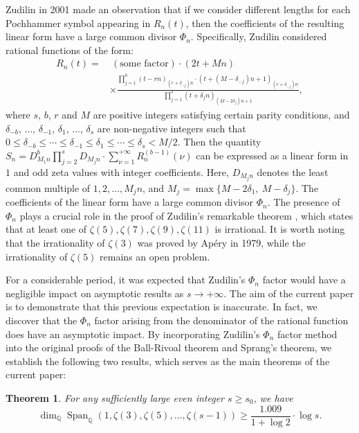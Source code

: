 \documentclass[12pt]{article}
\newtheorem{theorem}{Theorem}[section]
\numberwithin{equation}{section}
\begin{document}
Zudilin in 2001 made an observation \cite{Zud2001} that if we consider different lengths for each Pochhammer symbol appearing in $R_n(t)$, then the coefficients of the resulting linear form have a large common divisor $\Phi_n$. Specifically, Zudilin considered rational functions of the form:
\begin{align*}
R_n(t) =&~ (\text{some factor})\cdot(2t+Mn) \\
&\times \frac{\prod_{j=1}^{b}(t-rn)_{(r+\delta_{-j})n} \cdot (t+(M-\delta_{-j})n+1)_{(r+\delta_{-j})n}}{\prod_{j=1}^{s} (t+\delta_jn)_{(M-2\delta_j)n+1}}, 
\end{align*}
where $s$, $b$, $r$ and $M$ are positive integers satisfying certain parity conditions, and $\delta_{-b}$, $\ldots$, $\delta_{-1}$, $\delta_{1}$, $\ldots$, $\delta_{s}$ are non-negative integers such that $0 \leqslant \delta_{-b} \leqslant \cdots \leqslant \delta_{-1} \leqslant \delta_{1} \leqslant \cdots \leqslant \delta_{s} < M/2$. Then the quantity $S_n = D_{M_1n}^{b}\prod_{j=2}^{s} D_{M_jn} \cdot \sum_{\nu=1}^{+\infty} R_n^{(b-1)}(\nu)$ can be expressed as a linear form in $1$ and odd zeta values with integer coefficients. Here, $D_{M_jn}$ denotes the least common multiple of $1,2,\ldots,M_jn$, and $M_j= \max\{ M-2\delta_1,~M-\delta_j\}$. The coefficients of the linear form have a large common divisor $\Phi_n$. The presence of $\Phi_n$ plays a crucial role in the proof of Zudilin's remarkable theorem \cite{Zud2001}, which states that at least one of $\zeta(5), \zeta(7), \zeta(9), \zeta(11)$ is irrational. It is worth noting that the irrationality of $\zeta(3)$ was proved by Ap\'ery \cite{Ap1979} in 1979, while the irrationality of $\zeta(5)$ remains an open problem.

For a considerable period, it was expected that Zudilin's $\Phi_n$ factor would have a negligible impact on asymptotic results as $s \to +\infty$. The aim of the current paper is to demonstrate that this previous expectation is inaccurate. In fact, we discover that the $\Phi_n$ factor arising from the denominator of the rational function does have an asymptotic impact. By incorporating Zudilin's $\Phi_n$ factor method into the original proofs of the Ball-Rivoal theorem and Sprang's theorem, we establish the following two results, which serves as the main theorems of the current paper:

\begin{theorem}\label{mainthm}
For any sufficiently large even integer $s \geqslant s_0$, we have
\[ \dim_\mathbb{Q}\operatorname{Span}_{\mathbb{Q}}\left( 1,\zeta(3),\zeta(5),\ldots,\zeta(s-1) \right) \geqslant \frac{1.009}{1+\log 2}\cdot \log s.\]
\end{theorem}
\end{document}
